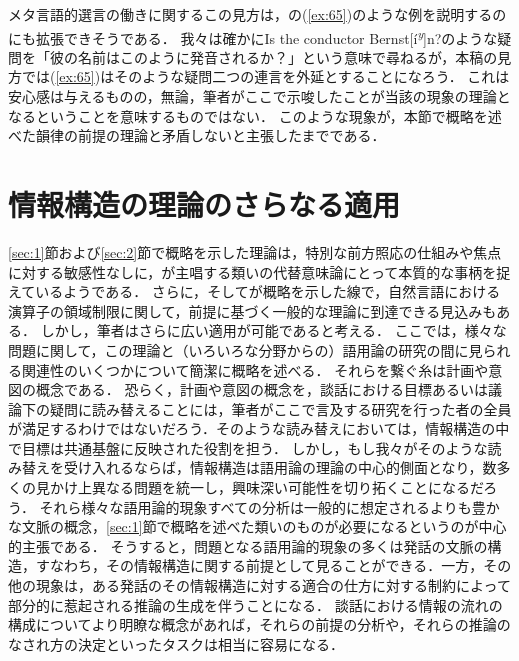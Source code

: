 \documentclass{goken}
\newcommand{\ori}[1]{\noindent\textcolor[gray]{0.7}{\fontsize{8pt}{8pt}\selectfont{\textsf{(p.~#1)}}} }
\begin{document}
\ori{59}
メタ言語的選言の働きに関するこの見方は，\citeauthor{Horn1989}の(\ref{ex:65})のような例を説明するのにも拡張できそうである．
我々は確かにIs the conductor Bernst[\'i\textsuperscript{\textit{y}}]n?のような疑問を「彼の名前はこのように発音されるか？」という意味で尋ねるが，本稿の見方では(\ref{ex:65})はそのような疑問二つの連言を外延とすることになろう．
これは安心感は与えるものの，無論，筆者がここで示唆したことが当該の現象の理論となるということを意味するものではない．
このような現象が，本節で概略を述べた韻律の前提の理論と矛盾しないと主張したまでである．

\section{情報構造の理論のさらなる適用}\label{sec:3}

\ref{sec:1}節および\ref{sec:2}節で概略を示した理論は，特別な前方照応の仕組みや焦点に対する敏感性なしに，\citet{Rooth1992a}が主唱する類いの代替意味論にとって本質的な事柄を捉えているようである．
さらに，\citet{Rooth1992a,Roberts1995,Calcagno1996}そして\citet{vonFintel2004}が概略を示した線で，自然言語における演算子の領域制限に関して，前提に基づく一般的な理論に到達できる見込みもある．
しかし，筆者はさらに広い適用が可能であると考える．
ここでは，様々な問題に関して，この理論と（いろいろな分野からの）語用論の研究の間に見られる関連性のいくつかについて簡潔に概略を述べる．
それらを繋ぐ糸は計画や意図の概念である．
恐らく，計画や意図の概念を，談話における目標あるいは議論下の疑問に読み替えることには，筆者がここで言及する研究を行った者の全員が満足するわけではないだろう．そのような読み替えにおいては，情報構造の中で目標は共通基盤に反映された役割を担う．
しかし，もし我々がそのような読み替えを受け入れるならば，情報構造は語用論の理論の中心的側面となり，数多くの見かけ上異なる問題を統一し，興味深い可能性を切り拓くことになるだろう．
それら様々な語用論的現象すべての分析は一般的に想定されるよりも豊かな文脈の概念，\ref{sec:1}節で概略を述べた類いのものが必要になるというのが中心的主張である．
そうすると，問題となる語用論的現象の多くは発話の文脈の構造，すなわち，その情報構造に関する前提として見ることができる．一方，その他の現象は，ある発話のその情報構造に対する適合の仕方に対する制約によって部分的に惹起される推論の生成を伴うことになる．
\ori{60}
談話における情報の流れの構成についてより明瞭な概念があれば，それらの前提の分析や，それらの推論のなされ方の決定といったタスクは相当に容易になる．
\end{document}
